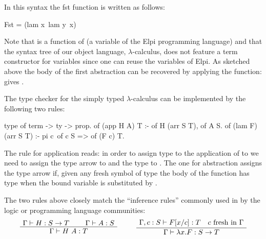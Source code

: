 \documentclass[a4paper, 11pt]{book}
\newenvironment{bprooftree}
  {\leavevmode\hbox\bgroup}
  {\DisplayProof\egroup}
\begin{document}
In this syntax the fst function is written as follows:

\begin{elpicode}
Fst = (lam x\ lam y\ x)
\end{elpicode}

Note that  is a function of  (a
variable of the Elpi programming language)
and that the syntax tree of our object language, $\lambda$-calculus, does not
feature a term constructor for variables since one can reuse the variables
of Elpi.
As sketched above the body of the first abstraction
can be recovered by applying the function: 
gives .



The type checker for the simply typed $\lambda$-calculus can be implemented by
the following two rules:

\begin{elpicode}
type of term -> ty -> prop.
of (app H A) T :- of H (arr S T), of A S.
of (lam F) (arr S T) :- pi c\ of c S => of (F c) T.
\end{elpicode}

The rule for application reads: in order to assign type  to
the application of  to  we need to assign
the type  arrow  to  and
the type  to . The one for abstraction
assigns the type  arrow  if, given any
fresh symbol  of type  the body of
the function  has type  when the bound variable
is substituted by .


The two rules above closely match the ``inference rules'' commonly used in
by the logic or programming language communities:
$$
\begin{bprooftree}
  \AxiomC{$\Gamma \vdash H : S \to T$}
  \AxiomC{$\Gamma \vdash A : S$}
  \BinaryInfC{$\Gamma \vdash H~A : T$}
\end{bprooftree}
\qquad
\begin{bprooftree}
  \AxiomC{$\Gamma, c : S \vdash F[x/c] : T \quad c~\mathrm{fresh~in}~\Gamma$}
  \UnaryInfC{$\Gamma \vdash \lambda x.F : S \to T$}
\end{bprooftree}
$$
\end{document}
